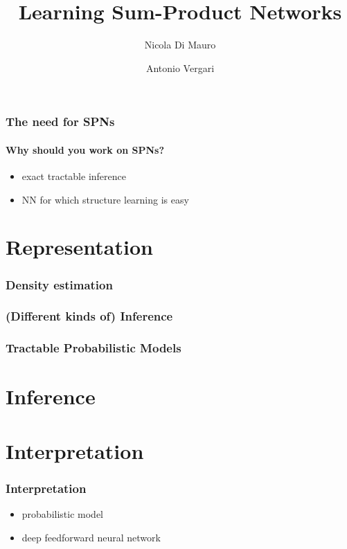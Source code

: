 \documentclass[xcolor={usenames,dvipsnames,svgnames}, compress]{beamer}
\title{Learning Sum-Product Networks}
\author{Nicola Di Mauro \and Antonio Vergari}
\institute{Università degli Studi di Bari}
\begin{document}
\begin{frame}
  \titlepage
\end{frame}


\begin{frame}[t]
  \frametitle{The need for SPNs}
  \framesubtitle{Why should you work on SPNs?}
\begin{itemize}
\item exact tractable inference
  \item NN for which structure learning is easy
\end{itemize}
\end{frame}

\section{Representation}
{
  \begin{frame}
    \sectionpage
  \end{frame}
}

\begin{frame}
  \frametitle{Density estimation}
\end{frame}

\begin{frame}
  \frametitle{(Different kinds of) Inference}
\end{frame}

\begin{frame}
  \frametitle{Tractable Probabilistic Models}
\end{frame}

\section{Inference}
{
  \begin{frame}
    \sectionpage
  \end{frame}
}


\section{Interpretation}
{
  \begin{frame}
    \sectionpage
  \end{frame}
}

\begin{frame}
\frametitle{Interpretation}
\begin{itemize}
\item probabilistic model
\item deep feedforward neural network
\end{itemize}
\end{frame}
\end{document}
